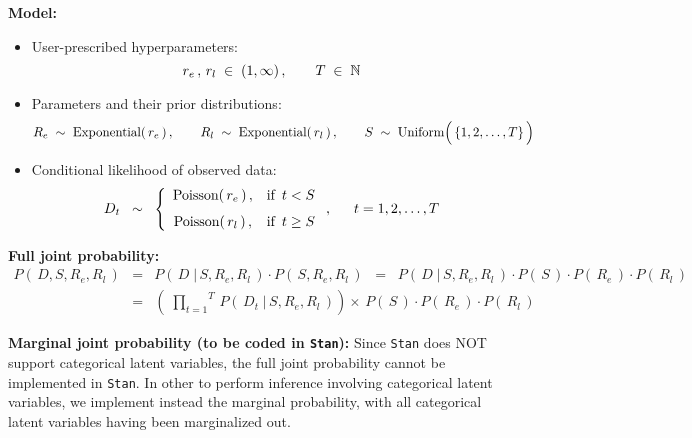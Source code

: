 
\vskip 0.5cm
\noindent
\textbf{Model:}
\begin{itemize}
\item
	User-prescribed hyperparameters:
	\begin{equation*}
	r_{e}\,,\, r_{l} \; \in \; (1,\infty)\,,
	\quad\quad
	T \; \in \; \mathbb{N}
	\end{equation*}
\item
	Parameters and their prior distributions:
	\begin{equation*}
	R_{e} \;\sim\; \textnormal{Exponential}(\,r_{e}\,)\,,
	\quad\quad
	R_{l} \;\sim\; \textnormal{Exponential}(\,r_{l}\,)\,,
	\quad\quad
	S \;\sim\; \textnormal{Uniform}\!\left(\,\{\overset{{\color{white}.}}{1},2,\ldots,T\}\,\right)
	\end{equation*}
\item
	Conditional likelihood of observed data:
	\begin{equation*}
	D_{t}
	\;\; \sim \;\;
		\left\{\begin{array}{ccc}
		\textnormal{Poisson}(\,r_{e}\,)\,, & \textnormal{if \,$t < S$}
		\\
		\overset{{\color{white}1}}{\textnormal{Poisson}(\,r_{l}\,)}\,, & \textnormal{if \,$t \geq S$}
		\end{array}\right.,
	\quad\;\;
	t = 1, 2, \ldots, T
	\end{equation*}
\end{itemize}


\vskip 0.5cm
\noindent
\textbf{Full joint probability:}
\begin{eqnarray*}
P\!\left(\,D,S,R_{e},R_{l}\,\right)
& = &
	P\!\left(\,D \;\vert\, S,R_{e},R_{l}\,\right)
	\cdot
	P\!\left(\,S,R_{e},R_{l}\,\right)
\;\; = \;\;
	P\!\left(\,D \;\vert\, S,R_{e},R_{l}\,\right)
	\cdot
	P\!\left(\,S\,\right)
	\cdot
	P\!\left(\,R_{e}\,\right)
	\cdot
	P\!\left(\,R_{l}\,\right)
\\
& = &
	\left(\;
		\overset{T}{\underset{t=1}{\prod}}\,
		P\!\left(\,D_{t} \;\vert\, S,R_{e},R_{l}\,\right)
		\right)
	\times\,
	P\!\left(\,S\,\right)
	\cdot
	P\!\left(\,R_{e}\,\right)
	\cdot
	P\!\left(\,R_{l}\,\right)
\end{eqnarray*}


\vskip 0.5cm
\noindent
\textbf{Marginal joint probability (to be coded in \texttt{Stan}):}
\vskip 0.3cm
\noindent
Since \texttt{Stan} does NOT support categorical latent variables,
the full joint probability cannot be implemented in \texttt{Stan}.
In other to perform inference involving categorical latent variables,
we implement instead the marginal probability,
with all categorical latent variables having been marginalized out.


